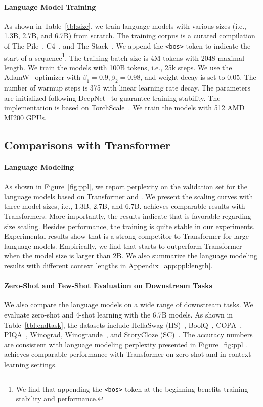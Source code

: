 \paragraph{Language Model Training} As shown in Table~\ref{tbl:size}, we train language models with various sizes (i.e., 1.3B, 2.7B, and 6.7B) from scratch. The training corpus is a curated compilation of The Pile~\cite{pile}, C4~\cite{c4:ai2}, and The Stack~\cite{TheStack}. We append the \texttt{<bos>} token to indicate the start of a sequence\footnote{We find that appending the \texttt{<bos>} token at the beginning benefits training stability and performance.}. The training batch size is 4M tokens with 2048 maximal length. We train the models with 100B tokens, i.e., 25k steps. We use the AdamW~\cite{adamw} optimizer with $\beta_1=0.9, \beta_2=0.98$, and weight decay is set to $0.05$. The number of warmup steps is 375 with linear learning rate decay. The parameters are initialized following DeepNet~\cite{deepnet} to guarantee training stability. The implementation is based on TorchScale~\cite{torchscale}. We train the models with 512 AMD MI200 GPUs.

\subsection{Comparisons with Transformer}

\paragraph{Language Modeling} As shown in Figure~\ref{fig:ppl}, we report perplexity on the validation set for the language models based on Transformer and \our{}.
We present the scaling curves with three model sizes, i.e., 1.3B, 2.7B, and 6.7B.
\our{} achieves comparable results with Transformers. More importantly, the results indicate that \our{} is favorable regarding size scaling. Besides performance, the \our{} training is quite stable in our experiments. Experimental results show that \our{} is a strong competitor to Transformer for large language models. Empirically, we find that \our{} starts to outperform Transformer when the model size is larger than 2B. We also summarize the language modeling results with different context lengths in Appendix~\ref{app:ppl:length}.

\paragraph{Zero-Shot and Few-Shot Evaluation on Downstream Tasks} We also compare the language models on a wide range of downstream tasks. We evaluate zero-shot and 4-shot learning with the 6.7B models. As shown in Table~\ref{tbl:endtask}, the datasets include HellaSwag (HS)~\cite{hellaswag}, BoolQ~\cite{boolq}, COPA~\cite{superglue}, PIQA~\cite{piqa}, Winograd, Winogrande~\cite{winograd2012}, and StoryCloze (SC)~\cite{storycloze}. The accuracy numbers are consistent with language modeling perplexity presented in Figure~\ref{fig:ppl}.
\our{} achieves comparable performance with Transformer on zero-shot and in-context learning settings.

